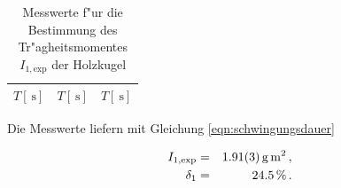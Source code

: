 				\begin{table}[h!]
					\begin{center}
						\label{tabelle:kugel}
						\caption{Messwerte f"ur die Bestimmung des Tr"agheitsmomentes $I_\mathrm{1, exp}$ der Holzkugel}
						\begin{tabular}{|c||c||c|}
							\hline
							$T [\SI{}{\second}]$ & $T [\SI{}{\second}]$ & $T [\SI{}{\second}]$ \\
							\hline 
							\hline
							
							\hline 
						\end{tabular}
					\end{center}
				\end{table}

				Die Messwerte liefern mit Gleichung \eqref{eqn:schwingungsdauer}

				\begin{eqnarray*}
					I_\mathrm{1, exp} & = & \SI{1.91 (3)}{\gram \meter \squared} \,, \\
					\delta_1 & = & \SI{24.5}{\percent} \,.
				\end{eqnarray*}

			\clearpage
